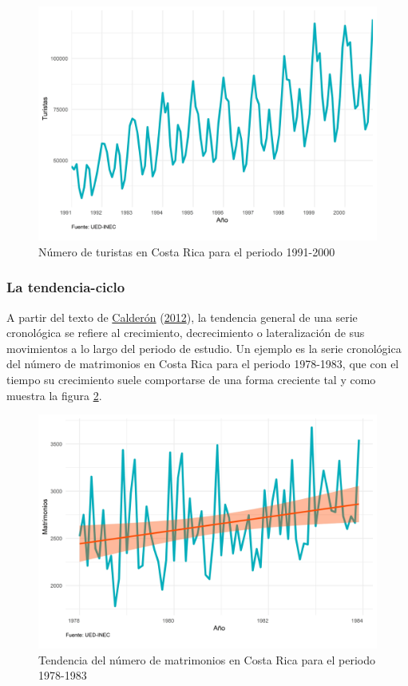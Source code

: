\documentclass[
]{article}
\begin{document}
\begin{figure}[!h]
\includegraphics[width=1\linewidth,height=1\textheight]{Tesis_files/figure-latex/ejemplo_multiplicativa-1} \caption{Número de turistas en Costa Rica para el periodo 1991-2000}\label{fig:ejemplo_multiplicativa}
\end{figure}

\subsubsection{La tendencia-ciclo}

A partir del texto de
\protect\hyperlink{ref-calderon2012estadistica}{Calderón}
(\protect\hyperlink{ref-calderon2012estadistica}{2012}), la tendencia
general de una serie cronológica se refiere al crecimiento,
decrecimiento o lateralización de sus movimientos a lo largo del periodo
de estudio. Un ejemplo es la serie cronológica del número de matrimonios
en Costa Rica para el periodo 1978-1983, que con el tiempo su
crecimiento suele comportarse de una forma creciente tal y como muestra
la figura \ref{fig:ejemplo_tendencia}.

\begin{figure}[!h]
\includegraphics[width=1\linewidth,height=1\textheight]{Tesis_files/figure-latex/ejemplo_tendencia-1} \caption{Tendencia del número de matrimonios en Costa Rica para el periodo 1978-1983}\label{fig:ejemplo_tendencia}
\end{figure}
\end{document}
